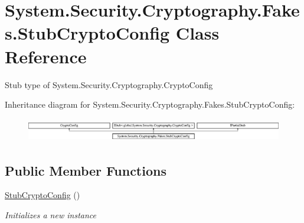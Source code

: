 \hypertarget{class_system_1_1_security_1_1_cryptography_1_1_fakes_1_1_stub_crypto_config}{\section{System.\-Security.\-Cryptography.\-Fakes.\-Stub\-Crypto\-Config Class Reference}
\label{class_system_1_1_security_1_1_cryptography_1_1_fakes_1_1_stub_crypto_config}
}


Stub type of System.\-Security.\-Cryptography.\-Crypto\-Config 


Inheritance diagram for System.\-Security.\-Cryptography.\-Fakes.\-Stub\-Crypto\-Config\-:\begin{figure}[H]
\begin{center}
\leavevmode
\includegraphics[height=1.031308cm]{class_system_1_1_security_1_1_cryptography_1_1_fakes_1_1_stub_crypto_config}
\end{center}
\end{figure}
\subsection*{Public Member Functions}
\begin{DoxyCompactItemize}
\item 
\hyperlink{class_system_1_1_security_1_1_cryptography_1_1_fakes_1_1_stub_crypto_config_ae9928739bd7fe6beb3b2f6dd3ef2ee3a}{Stub\-Crypto\-Config} ()
\begin{DoxyCompactList}\small\item\em Initializes a new instance\end{DoxyCompactList}\end{DoxyCompactItemize}
